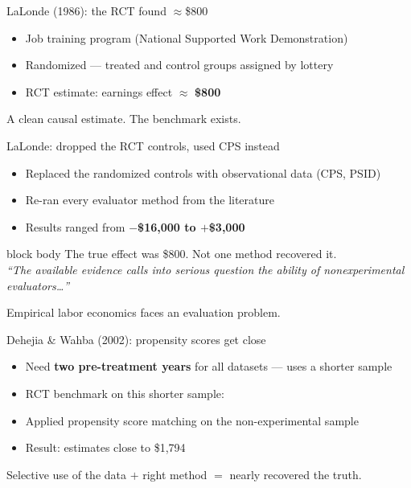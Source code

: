 \documentclass[aspectratio=169,11pt]{beamer}
\newcommand{\emphbox}[1]{%
  \begin{beamercolorbox}[rounded=true,sep=7pt,wd=\linewidth]{block body}%
    \small\color{slate} #1%
  \end{beamercolorbox}}
\begin{document}
\begin{frame}{LaLonde (1986): the RCT found $\approx$\$800}
\vspace{0.8em}
\begin{itemize}\setlength\itemsep{0.6em}
  \item Job training program (National Supported Work Demonstration)
  \item Randomized --- treated and control groups assigned by lottery
  \item RCT estimate: earnings effect $\approx$ \textbf{\$800}
\end{itemize}
\vspace{0.6em}
\begin{center}\color{warmgray}\small
A clean causal estimate. The benchmark exists.
\end{center}
\end{frame}

\begin{frame}{LaLonde: dropped the RCT controls, used CPS instead}
\vspace{0.6em}
\begin{itemize}\setlength\itemsep{0.55em}
  \item Replaced the randomized controls with observational data (CPS, PSID)
  \item Re-ran every evaluator method from the literature
  \item Results ranged from \textbf{$-$\$16,000 to $+$\$3,000}
\end{itemize}
\vspace{0.5em}
\emphbox{The true effect was \$800. Not one method recovered it. \\
\textit{``The available evidence calls into serious question the ability of nonexperimental evaluators\ldots''}}
\vspace{0.3em}
\begin{center}\color{warmgray}\small
Empirical labor economics faces an evaluation problem.
\end{center}
\end{frame}

\begin{frame}{Dehejia \& Wahba (2002): propensity scores get close}
\vspace{0.6em}
\begin{itemize}\setlength\itemsep{0.55em}
  \item Need \textbf{two pre-treatment years} for all datasets --- uses a shorter sample
  \item RCT benchmark on this shorter sample: 
  \item Applied propensity score matching on the non-experimental sample
  \item Result: estimates close to \$1,794
\end{itemize}
\vspace{0.5em}
\begin{center}\color{warmgray}\small
Selective use of the data $+$ right method $=$ nearly recovered the truth.
\end{center}
\end{frame}
\end{document}
